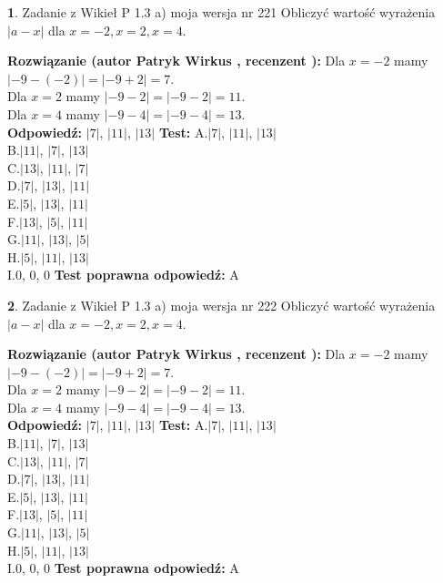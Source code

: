 \documentclass[12pt, a4paper]{article}
\theoremstyle{definition} %
\newtheorem{zad}{}
\newcommand{\zadStart}[1]{\begin{zad}#1\newline}
\newcommand{\zadStop}{\end{zad}}
\newcommand{\rozwStart}[2]{\noindent \textbf{Rozwiązanie (autor #1 , recenzent #2): }\newline}
\newcommand{\rozwStop}{\newline}
\newcommand{\odpStart}{\noindent \textbf{Odpowiedź:}\newline}
\newcommand{\odpStop}{\newline}
\newcommand{\testStart}{\noindent \textbf{Test:}\newline}
\newcommand{\testStop}{\newline}
\newcommand{\kluczStart}{\noindent \textbf{Test poprawna odpowiedź:}\newline}
\newcommand{\kluczStop}{\newline}
\begin{document}
\zadStart{Zadanie z Wikieł P 1.3 a) moja wersja nr 221}
Obliczyć wartość wyrażenia $|a - x|$ dla $x=-2,x=2,x=4$.
\zadStop
\rozwStart{Patryk Wirkus}{}
Dla $x = -2$ mamy $|-9 - (-2)| = |-9 + 2| = 7$.\\
Dla $x = 2$ mamy $|-9 - 2| = |-9 - 2| = 11$.\\
Dla $x = 4$ mamy $|-9 - 4| = |-9 - 4| = 13$.\\
\rozwStop
\odpStart
$|7|$, $|11|$, $|13|$
\odpStop
\testStart
A.$|7|$, $|11|$, $|13|$\\
B.$|11|$, $|7|$, $|13|$\\
C.$|13|$, $|11|$, $|7|$\\
D.$|7|$, $|13|$, $|11|$\\
E.$|5|$, $|13|$, $|11|$\\
F.$|13|$, $|5|$, $|11|$\\
G.$|11|$, $|13|$, $|5|$\\
H.$|5|$, $|11|$, $|13|$\\
I.$0$, $0$, $0$
\testStop
\kluczStart
A
\kluczStop



\zadStart{Zadanie z Wikieł P 1.3 a) moja wersja nr 222}
Obliczyć wartość wyrażenia $|a - x|$ dla $x=-2,x=2,x=4$.
\zadStop
\rozwStart{Patryk Wirkus}{}
Dla $x = -2$ mamy $|-9 - (-2)| = |-9 + 2| = 7$.\\
Dla $x = 2$ mamy $|-9 - 2| = |-9 - 2| = 11$.\\
Dla $x = 4$ mamy $|-9 - 4| = |-9 - 4| = 13$.\\
\rozwStop
\odpStart
$|7|$, $|11|$, $|13|$
\odpStop
\testStart
A.$|7|$, $|11|$, $|13|$\\
B.$|11|$, $|7|$, $|13|$\\
C.$|13|$, $|11|$, $|7|$\\
D.$|7|$, $|13|$, $|11|$\\
E.$|5|$, $|13|$, $|11|$\\
F.$|13|$, $|5|$, $|11|$\\
G.$|11|$, $|13|$, $|5|$\\
H.$|5|$, $|11|$, $|13|$\\
I.$0$, $0$, $0$
\testStop
\kluczStart
A
\kluczStop
\end{document}

